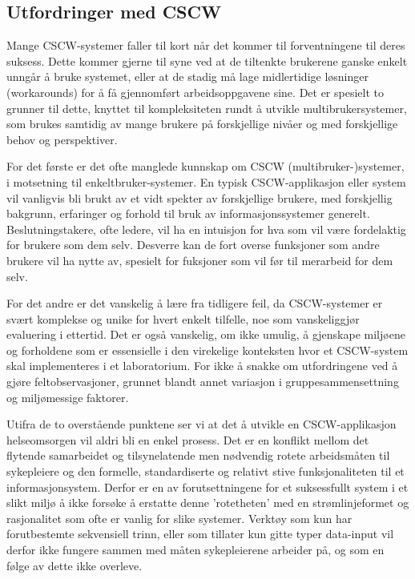 \subsection{Utfordringer med CSCW}
\label{chp: utfordringerMedCSCW}

Mange CSCW-systemer faller til kort når det kommer til forventningene til deres suksess. Dette kommer gjerne til syne ved at de tiltenkte brukerene ganske enkelt unngår å bruke systemet, eller at de stadig må lage midlertidige løsninger (workarounds) for å få gjennomført arbeidsoppgavene sine. Det er spesielt to grunner til dette, knyttet til kompleksiteten rundt å utvikle multibrukersystemer, som brukes samtidig av mange brukere på forskjellige nivåer og med forskjellige behov og perspektiver.

\noindent
For det første er det ofte manglede kunnskap om CSCW (multibruker-)systemer, i motsetning til enkeltbruker-systemer. En typisk CSCW-applikasjon eller system vil vanligvis bli brukt av et vidt spekter av forskjellige brukere, med forskjellig bakgrunn, erfaringer og forhold til bruk av informasjonssystemer generelt. Beslutningstakere, ofte ledere, vil ha en intuisjon for hva som vil være fordelaktig for brukere som dem selv. Desverre kan de fort overse funksjoner som andre brukere vil ha nytte av, spesielt for fuksjoner som vil før til merarbeid for dem selv. 

\noindent
For det andre er det vanskelig å lære fra tidligere feil, da CSCW-systemer er svært komplekse og unike for hvert enkelt tilfelle, noe som vanskeliggjør evaluering i ettertid. Det er også vanskelig, om ikke umulig, å gjenskape miljøene og forholdene som er essensielle i den virekelige konteksten hvor et CSCW-system skal implementeres i et laboratorium. For ikke å snakke om utfordringene ved å gjøre feltobservasjoner, grunnet blandt annet variasjon i gruppesammensettning og miljømessige faktorer.

\noindent
Utifra de to overstående punktene ser vi at det å utvikle en CSCW-applikasjon helseomsorgen vil aldri bli en enkel prosess. Det er en konflikt mellom det flytende samarbeidet og tilsynelatende men nødvendig rotete arbeidsmåten til sykepleiere og den formelle, standardiserte og relativt stive funksjonaliteten til et informasjonsystem. Derfor er en av forutsettningene for et suksessfullt system i et slikt miljø å ikke forsøke å erstatte denne 'rotetheten' med en strømlinjeformet og rasjonalitet som ofte er vanlig for slike systemer. Verktøy som kun har forutbestemte sekvensiell trinn, eller som tillater kun gitte typer data-input vil derfor ikke fungere sammen med måten sykepleierene arbeider på, og som en følge av dette ikke overleve.\cite{Berg99}